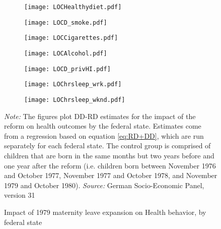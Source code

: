 \documentclass[a4paper ]{article}
\begin{document}
\newpage
\begin{figure}[p]\centering
\begin{subfigure}[h]{0.4\textwidth}\centering
	\texttt{[image: LOCHealthydiet.pdf]}
\end{subfigure}
\quad
\begin{subfigure}[h]{0.4\textwidth}\centering
	\texttt{[image: LOCD\_smoke.pdf]}
\end{subfigure}
\par\medskip
\begin{subfigure}[h]{0.4\textwidth}\centering
	\texttt{[image: LOCCigarettes.pdf]}
\end{subfigure}
\quad
\begin{subfigure}[h]{0.4\textwidth}\centering
	\texttt{[image: LOCAlcohol.pdf]}
\end{subfigure}
\par\medskip



\begin{subfigure}[h]{0.4\textwidth}\centering
	\texttt{[image: LOCD\_privHI.pdf]}
\end{subfigure}
\quad
\begin{subfigure}[h]{0.4\textwidth}\centering
	\texttt{[image: LOChrsleep\_wrk.pdf]}
\end{subfigure}
\par\medskip

\begin{subfigure}[h]{0.4\textwidth}\centering
	\texttt{[image: LOChrsleep\_wknd.pdf]}
\end{subfigure}


\caption{Impact of 1979 maternity leave expansion on Health behavior, by federal state}\label{fig: LOC_HB}
\begin{minipage}{\textwidth} %
{\footnotesize \textit{Note:} The figures plot DD-RD estimates for the impact of the reform on health outcomes by the federal state. Estimates come from a regression based on equation \ref{eq:RD+DD}, which are run separately for each federal state. The control group is comprised of children that are born in the same months but two years before and one year after the reform (i.e. children born between November 1976 and October 1977, November 1977 and October 1978, and November 1979 and October 1980). \newline \textit{Source: }German Socio-Economic Panel, version 31\par}
\end{minipage}
\end{figure}    
    
\end{document}
